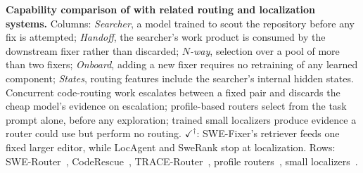 \begin{table}[!tbp]
\centering
\caption{\textbf{Capability comparison of \sysname with related routing and
localization systems.}
Columns: \emph{Searcher}, a model trained to scout the repository before
any fix is attempted;
\emph{Handoff}, the searcher's work product is consumed by the downstream
fixer rather than discarded;
\emph{$N$-way}, selection over a pool of more than two fixers;
\emph{Onboard}, adding a new fixer requires no retraining of any learned
component;
\emph{States}, routing features include the searcher's internal hidden
states.
Concurrent code-routing work escalates between a fixed pair and discards
the cheap model's evidence on escalation;
profile-based routers select from the task prompt alone, before any
exploration;
trained small localizers produce evidence a router could use but perform no
routing.
$\checkmark^{\dagger}$: SWE-Fixer's retriever feeds one fixed larger editor,
while LocAgent and SweRank stop at localization.
Rows: SWE-Router~\citep{swerouter}, CodeRescue~\citep{coderescue},
TRACE-Router~\citep{tracerouter},
profile routers~\citep{embedllm,iclrouter,shnitzer},
small localizers~\citep{swefixer,locagent,swerank}.}
\label{tab:capability-matrix}

\end{table}
\FloatBarrier
